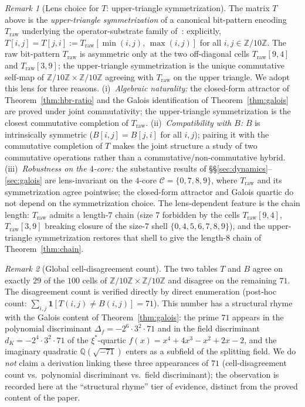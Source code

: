 \documentclass[11pt,reqno]{amsart}
\theoremstyle{plain}
\theoremstyle{definition}
\theoremstyle{remark}
\newtheorem*{remark}{Remark}
\newcommand{\Z}{\mathbb{Z}}
\newcommand{\Q}{\mathbb{Q}}
\newcommand{\Zten}{\Z/10\Z}
\newcommand{\Cfour}{\mathcal{C}}
\begin{document}
\begin{remark}[Lens choice for $T$: upper-triangle symmetrization]\label{rem:lens-choice}
The matrix $T$ above is the \emph{upper-triangle symmetrization} of a
canonical bit-pattern encoding $T_{\mathrm{raw}}$ underlying the
operator-substrate family of~\cite{SandersGish2026Sigma}: explicitly,
$T[i,j]=T[j,i]:=T_{\mathrm{raw}}[\min(i,j),\,\max(i,j)]$ for all
$i,j\in\Zten$. The raw bit-pattern $T_{\mathrm{raw}}$ is asymmetric
only at the two off-diagonal cells $T_{\mathrm{raw}}[9,4]$ and
$T_{\mathrm{raw}}[3,9]$; the upper-triangle symmetrization is the
unique commutative self-map of $\Zten\times\Zten$ agreeing with
$T_{\mathrm{raw}}$ on the upper triangle. We adopt this lens for
three reasons. (i)~\emph{Algebraic naturality:} the closed-form
attractor of Theorem~\ref{thm:hbr-ratio} and the Galois identification
of Theorem~\ref{thm:galois} are proved under joint commutativity; the
upper-triangle symmetrization is the closest commutative completion
of $T_{\mathrm{raw}}$. (ii)~\emph{Compatibility with $B$:} $B$ is
intrinsically symmetric ($B[i,j]=B[j,i]$ for all $i,j$); pairing it
with the commutative completion of $T$ makes the joint structure a
study of two commutative operations rather than a
commutative/non-commutative hybrid. (iii)~\emph{Robustness on the
$4$-core:} the substantive results of \S\S\ref{sec:dynamics}--\ref{sec:galois}
are lens-invariant on the $4$-core $\Cfour=\{0,7,8,9\}$, where
$T_{\mathrm{raw}}$ and its symmetrization agree pointwise; the
closed-form attractor and Galois quartic do not depend on the
symmetrization choice. The lens-dependent feature is the chain
length: $T_{\mathrm{raw}}$ admits a length-$7$ chain (size $7$
forbidden by the cells $T_{\mathrm{raw}}[9,4]$, $T_{\mathrm{raw}}[3,9]$
breaking closure of the size-$7$ shell $\{0,4,5,6,7,8,9\}$), and the
upper-triangle symmetrization restores that shell to give the
length-$8$ chain of Theorem~\ref{thm:chain}.
\end{remark}

\begin{remark}[Global cell-disagreement count]\label{rem:disagreement-count}
The two tables $T$ and $B$ agree on exactly $29$ of the $100$ cells
of $\Zten\times\Zten$ and disagree on the remaining $71$. The
disagreement count is verified directly by direct enumeration
(post-hoc count: $\sum_{i,j}\mathbf{1}[T(i,j)\neq B(i,j)]=71$). This
number has a structural rhyme with the Galois content of
Theorem~\ref{thm:galois}: the prime $71$ appears in the polynomial
discriminant $\Delta_{f}=-2^{6}\cdot 3^{2}\cdot 71$ and in the field
discriminant $d_{K}=-2^{4}\cdot 3^{2}\cdot 71$ of the $\xi^{*}$-quartic
$f(x)=x^{4}+4x^{3}-x^{2}+2x-2$, and the imaginary quadratic
$\Q(\sqrt{-71})$ enters as a subfield of the splitting field. We do
\emph{not} claim a derivation linking these three appearances of $71$
(cell-disagreement count vs.\ polynomial discriminant vs.\ field
discriminant); the observation is recorded here at the
``structural rhyme'' tier of evidence, distinct from the proved
content of the paper.
\end{remark}
\end{document}
